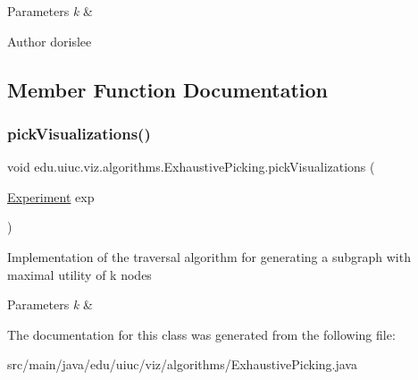 \begin{DoxyParams}{Parameters}
{\em k} & \\
\hline
\end{DoxyParams}
\begin{DoxyAuthor}{Author}
dorislee 
\end{DoxyAuthor}


\subsection{Member Function Documentation}
\mbox{\label{classedu_1_1uiuc_1_1viz_1_1algorithms_1_1_exhaustive_picking_a03c9781724cd64c0d1294c06b9bb9ceb}} 
\subsubsection{\texorpdfstring{pickVisualizations()}{pickVisualizations()}}
{\footnotesize\ttfamily void edu.\+uiuc.\+viz.\+algorithms.\+Exhaustive\+Picking.\+pick\+Visualizations (\begin{DoxyParamCaption}\item[{\mbox{\hyperlink{classedu_1_1uiuc_1_1viz_1_1algorithms_1_1_experiment}{Experiment}}}]{exp }\end{DoxyParamCaption})}

Implementation of the traversal algorithm for generating a subgraph with maximal utility of k nodes


\begin{DoxyParams}{Parameters}
{\em k} & \\
\hline
\end{DoxyParams}


The documentation for this class was generated from the following file\+:\begin{DoxyCompactItemize}
\item 
src/main/java/edu/uiuc/viz/algorithms/Exhaustive\+Picking.\+java\end{DoxyCompactItemize}
